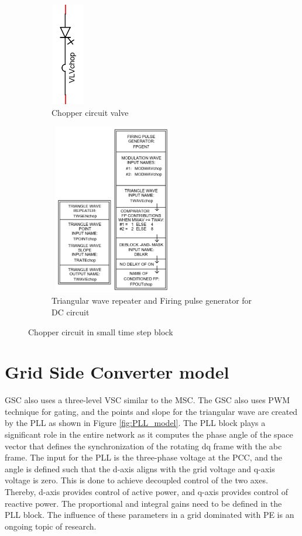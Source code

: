 \begin{figure}[H]
\centering
\begin{subfigure}{.3\textwidth}
  \centering
  \includegraphics[height=4.5cm,width=1.5cm]{Diagrams/Appendix_A/Chopper_circuit.PNG}
  \caption{Chopper circuit valve}
  \label{fig:Chopper_circuit}
\end{subfigure}%
\begin{subfigure}{.5\textwidth}
  \centering
  \includegraphics[height=7.5cm,width=5.5cm]{Diagrams/Appendix_A/Chopper_circuit_firing.PNG}
  \caption{Triangular wave repeater and Firing pulse generator for DC circuit}
  \label{fig:Chopper_circuit_firing}
\end{subfigure}
\caption{Chopper circuit in small time step block}
\label{fig:Chopper_circuit_valve_firing}
\end{figure}

\section{Grid Side Converter model}
\gls{GSC} also uses a three-level \gls{VSC} similar to the \gls{MSC}. The \gls{GSC} also uses \gls{PWM} technique for gating, and the points and slope for the triangular wave are created by the \gls{PLL} as shown in Figure \ref{fig:PLL_model}. The \gls{PLL} block plays a significant role in the entire network as it computes the phase angle of the space vector that defines the synchronization of the rotating \gls{dq} frame with the abc frame. The input for the \gls{PLL} is the three-phase voltage at the \gls{PCC}, and the angle is defined such that the d-axis aligns with the grid voltage and q-axis voltage is zero. This is done to achieve decoupled control of the two axes. Thereby, d-axis provides control of active power, and q-axis provides control of reactive power. The proportional and integral gains need to be defined in the \gls{PLL} block. The influence of these parameters in a grid dominated with \gls{PE} is an ongoing topic of research.

